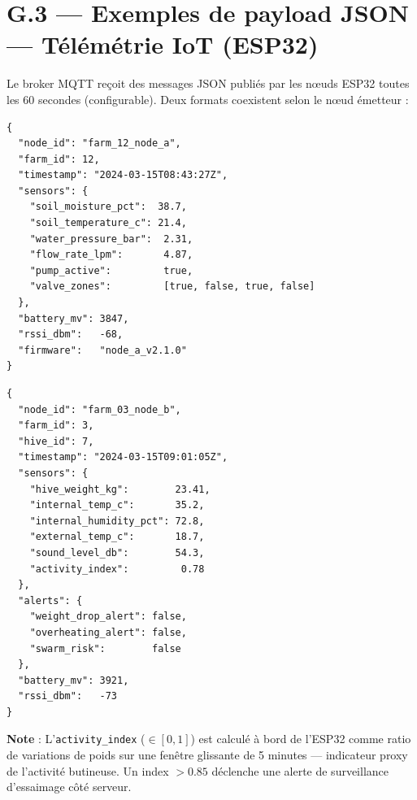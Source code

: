 \section*{G.3 — Exemples de payload JSON — Télémétrie IoT (ESP32)}

Le broker MQTT reçoit des messages JSON publiés par les nœuds ESP32 toutes les
60 secondes (configurable). Deux formats coexistent selon le nœud émetteur :

\begin{lstlisting}[caption={Payload JSON — Nœud A : contrôleur irrigation (ESP32-WROOM-32)},
  label={lst:json_node_a}]
{
  "node_id": "farm_12_node_a",
  "farm_id": 12,
  "timestamp": "2024-03-15T08:43:27Z",
  "sensors": {
    "soil_moisture_pct":  38.7,
    "soil_temperature_c": 21.4,
    "water_pressure_bar":  2.31,
    "flow_rate_lpm":       4.87,
    "pump_active":         true,
    "valve_zones":         [true, false, true, false]
  },
  "battery_mv": 3847,
  "rssi_dbm":   -68,
  "firmware":   "node_a_v2.1.0"
}
\end{lstlisting}

\begin{lstlisting}[caption={Payload JSON — Nœud B : monitoring ruche (ESP32-WROOM-32)},
  label={lst:json_node_b}]
{
  "node_id": "farm_03_node_b",
  "farm_id": 3,
  "hive_id": 7,
  "timestamp": "2024-03-15T09:01:05Z",
  "sensors": {
    "hive_weight_kg":        23.41,
    "internal_temp_c":       35.2,
    "internal_humidity_pct": 72.8,
    "external_temp_c":       18.7,
    "sound_level_db":        54.3,
    "activity_index":         0.78
  },
  "alerts": {
    "weight_drop_alert": false,
    "overheating_alert": false,
    "swarm_risk":        false
  },
  "battery_mv": 3921,
  "rssi_dbm":   -73
}
\end{lstlisting}

\textbf{Note} : L'\texttt{activity\_index} ($\in [0,1]$) est calculé à bord de l'ESP32
comme ratio de variations de poids sur une fenêtre glissante de 5 minutes — indicateur
proxy de l'activité butineuse. Un index $> 0.85$ déclenche une alerte de surveillance
d'essaimage côté serveur.

